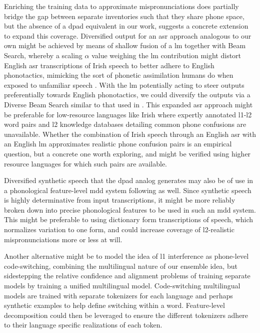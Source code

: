 \documentclass[thesis]{cluu}
\begin{document}
Enriching the training data to approximate mispronunciations does partially bridge the gap between separate inventories such that they share phone space, but the absence of a \gls{dpad} equivalent in our work, suggests a concrete extension to expand this coverage. Diversified output for an \gls{asr} approach analogous to our own might be achieved by means of shallow fusion of a \gls{lm} together with Beam Search, whereby a scaling $\alpha$ value weighing the \gls{lm} contribution might distort English \gls{asr} transcriptions of Irish speech to better adhere to English phonotactics, mimicking the sort of phonetic assimilation humans do when exposed to unfamiliar speech \parencite[For an example of \gls{l1} interference on \gls{l2} perception, see ][]{kartushinaRoleL1Speech2013}. With the \gls{lm} potentially acting to steer outputs preferentially towards English phonotactics, we could diversify the outputs via a Diverse Beam Search \parencite{vijayakumarDiverseBeamSearch2018} similar to that used in \textcite{zhangL2GENNeuralPhoneme2022}. This expanded \gls{asr} approach might be preferable for low-resource languages like Irish where expertly annotated \gls{l1}-\gls{l2} word pairs and \gls{l2} knowledge databases detailing common phone confusions are unavailable. Whether the combination of Irish speech through an English \gls{asr} with an English \gls{lm} approximates realistic phone confusion pairs is an empirical question, but a concrete one worth exploring, and might be verified using higher resource languages for which such pairs are available.

Diversified synthetic speech that the \gls{dpad} analog generates may also be of use in a phonological feature-level \gls{mdd} system following \textcite{shahinPhonologicalLevelWav2vec2based2025} as well. Since synthetic speech is highly determinative from input transcriptions, it might be more reliably broken down into precise phonological features to be used in such an \gls{mdd} system. This might be preferable to using dictionary form transcriptions of speech, which normalizes variation to one form, and could increase coverage of \gls{l2}-realistic mispronunciations more or less at will. 

Another alternative might be to model the idea of \gls{l1} interference as phone-level code-switching, combining the multilingual nature of our ensemble idea, but sidestepping the relative confidence and alignment problems of training separate models by training a unified multilingual model. Code-switching multilingual models are trained with separate tokenizers for each language and perhaps synthetic examples to help define switching within a word. Feature-level decomposition could then be leveraged to ensure the different tokenizers adhere to their language specific realizations of each token.
\end{document}
